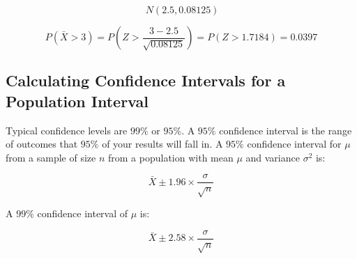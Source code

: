 \documentclass{article}
\begin{document}
\[~ N\left(2.5, 0.08125\right)\]

\[P\left(\bar{X} > 3\right) = P\left(Z > \frac{3 - 2.5}{\sqrt{0.08125}}\right) =
P\left(Z > 1.7184\right) = 0.0397\]

\subsection{Calculating Confidence Intervals for a Population Interval}

Typical confidence levels are $99\%$ or $95\%$. A $95\%$ confidence interval is the
range of outcomes that $95\%$ of your results will fall in. A $95\%$ confidence
interval for $\mu$ from a sample of size $n$ from a population with mean $\mu$
and variance $\sigma^2$ is:

\[\bar{X} \pm 1.96 \times \frac{\sigma}{\sqrt{n}}\]

\noindent A $99\%$ confidence interval of $\mu$ is:

\[\bar{X} \pm 2.58 \times \frac{\sigma}{\sqrt{n}}\]

\begin{figure}
    
    \begin{tikzpicture}

    \end{tikzpicture}

\end{figure}
\end{document}
